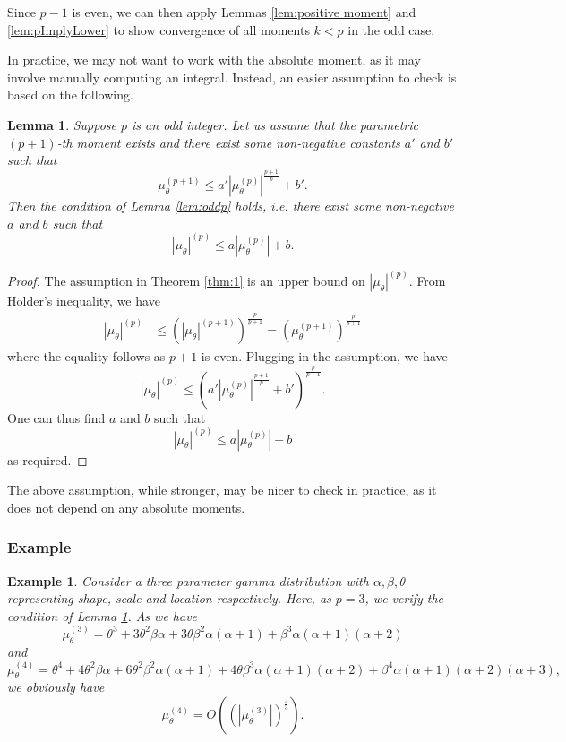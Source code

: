 \documentclass[11pt,a4paper]{article}
\theoremstyle{plain}
\newtheorem{lemma}{Lemma}
\newtheorem{example}{Example}
\theoremstyle{remark}
\theoremstyle{remark}
\begin{document}
Since $p-1$ is even, we can then apply Lemmas \ref{lem:positive moment} and \ref{lem:pImplyLower} to show convergence of all moments $k < p$ in the odd case.
 
In practice, we may not want to work with the absolute moment, as it may involve manually computing an integral. Instead, an easier assumption to check is based on the following.
\begin{lemma}\label{lem:oddp2} Suppose $p$ is an odd integer. Let us assume that the parametric $(p+1)$-th moment exists and there exist some non-negative constants $a'$ and $b'$ such that
$$
\mu_\theta^{(p+1)} \leq  a' |\mu_\theta^{(p)}|^{\frac{p+1}{p}} + b'.
$$
Then the condition of Lemma \ref{lem:oddp} holds, i.e. there exist some non-negative $a$ and $b$ such that
    $$|\mu_\theta|^{(p)} \leq a|\mu^{(p)}_\theta |+ b.$$
\end{lemma}
\begin{proof}
The assumption in Theorem \ref{thm:1} is an upper bound on $|\mu_\theta|^{(p)}$. From H\"{o}lder's inequality, we have
\begin{align*}
|\mu_\theta|^{(p)} &\leq \left(|\mu_\theta|^{(p+1)}\right)^{\frac{p}{p+1}} = \left(\mu_\theta^{(p+1)}\right)^{\frac{p}{p+1}}
\end{align*}
where the equality follows as $p+1$ is even. Plugging in the assumption, we have
$$
|\mu_\theta|^{(p)} \leq \left(a' |\mu_\theta^{(p)}|^{\frac{p+1}{p}} + b'\right)^{\frac{p}{p+1}}.
$$
One can thus find $a$ and $b$ such that
$$
|\mu_\theta|^{(p)} \leq a |\mu_\theta^{(p)}| + b
$$
as required.
\end{proof}
The above assumption, while stronger, may be nicer to check in practice, as it does not depend on any absolute moments.

\subsubsection{Example}
\begin{example}
Consider a three parameter gamma distribution with $\alpha,\beta,\theta$ representing shape, scale and location respectively. Here, as $p = 3$, we verify the condition of Lemma \ref{lem:oddp2}. As we have $$\mu_\theta^{(3)}=\theta^3+3\theta^2\beta\alpha+3\theta\beta^2\alpha(\alpha+1)+\beta^3\alpha(\alpha+1)(\alpha+2)$$
and 
$$\mu_\theta^{(4)}=\theta^4+4\theta^2\beta\alpha+6\theta^2\beta^2\alpha(\alpha+1)+4\theta\beta^3\alpha(\alpha+1)(\alpha+2)+\beta^4\alpha(\alpha+1)(\alpha+2)(\alpha+3),$$
we obviously have $$\mu_\theta^{(4)}=O\left(\left(|\mu_\theta^{(3)}|\right)^{\frac{4}{3}}\right).$$
\end{example}
\end{document}
